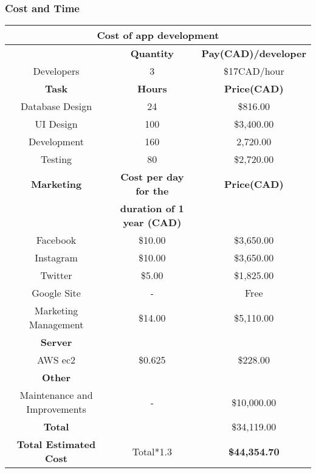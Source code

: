 \subsubsection{Cost and Time}
\begin{center}
    \begin{tabular}{|c|c|c|}
        \hline
        \multicolumn{3}{|c|}{\textbf{Cost of app development}} \\
        \hline
         & \textbf{Quantity} & \textbf{Pay(CAD)/developer} \\
        \hline
        Developers & 3 & \$17CAD/hour \\
        \hline
        \textbf{Task} & \textbf{Hours} & \textbf{Price(CAD)} \\
        \hline
        Database Design & 24 & \$816.00 \\
        \hline
        UI Design & 100 & \$3,400.00 \\
        \hline
        Development & 160 & 2,720.00 \\
        \hline
        Testing & 80 & \$2,720.00 \\
        \hline
        \textbf{Marketing} & \textbf{Cost per day for the} & \textbf{Price(CAD)} \\
        & \textbf{duration of 1 year (CAD)} & \\
        \hline
        Facebook & \$10.00 & \$3,650.00 \\
        \hline
        Instagram & \$10.00 & \$3,650.00 \\
        \hline
        Twitter & \$5.00 & \$1,825.00 \\
        \hline
        Google Site & - & Free \\
        \hline
        Marketing Management & \$14.00 & \$5,110.00 \\
        \hline
        \textbf{Server} & & \\
        \hline
        AWS ec2 &\$0.625 & \$228.00 \\
        \hline
        \textbf{Other} & & \\
        \hline
        Maintenance and Improvements & - & \$10,000.00 \\
        \hline
        \textbf{Total} & & \$34,119.00 \\
        \hline
        \textbf{Total Estimated Cost} & Total*1.3 & \textbf{\$44,354.70} \\
        \hline
    \end{tabular}
\end{center}

